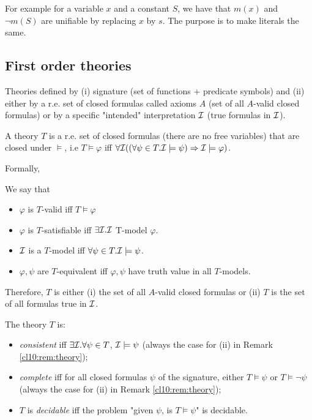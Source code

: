 \begin{example}
        For example for a variable $x$ and a constant $S$, we have that $m(x)$ and $\neg m(S)$ are unifiable by replacing $x $ by $s$. The purpose is to make literals the same.
\end{example}

\subsection{First order theories} 


\begin{remark}
    Theories defined by (i) signature (set of functions + predicate symbols) and (ii) either by a r.e. set of closed formulas called axioms $A$ (set of all $A$-valid closed formulas) or by a specific "intended" interpretation $\mathcal{I}$ (true formulas in $\mathcal{I}$).
\end{remark}

\begin{definition}
    A theory $T$ is a r.e. set of closed formulas (there are no free variables) that are closed under $\models$, i.e 
     $T \models \varphi $  iff $\forall \mathcal{I} ((\forall \psi \in T.  \mathcal{I} \models \psi) \Rightarrow  \mathcal{I} \models \varphi )$. 
\end{definition}
Formally, 

\begin{definition}
    We say that 
\begin{itemize}
    \item $\varphi $ is $T$-valid iff $T \models \varphi $
    \item $\varphi $ is $T$-satisfiable iff $\exists  \mathcal{I}.  \mathcal{I}$ T-model $\varphi $.
    \item $ \mathcal{I}$ is a $T$-model iff $\forall \psi \in T.  \mathcal{I} \models \psi$.
    \item $\varphi , \psi$ are $T$-equivalent iff $\varphi ,\psi$ have truth value in all $T$-models.
\end{itemize}
\end{definition}

\begin{remark}
    \label{cl10:rem:theory}
    Therefore, $T$ is either (i) the set of all $A$-valid closed formulas or (ii) $T$ is the set of all formulas true in $\mathcal{I}$.
\end{remark}


\begin{definition}
    The theory $T$ is: 
    \begin{itemize}
        \item   \emph{consistent} iff $\exists \mathcal{I}. \forall \psi \in T$, $\mathcal{I}\models \psi$ (always the case for (ii) in Remark 
        \ref{cl10:rem:theory}); 
        \item \emph{complete} iff for all closed formulas $\psi$ of the signature, either $T \models \psi$ or $T \models \neg \psi$ (always the case for (ii) in Remark \ref{cl10:rem:theory});
        \item  $T$ is \emph{decidable} iff the problem "given $\psi$, is $T \models \psi$" is decidable.
    \end{itemize}
\end{definition}


